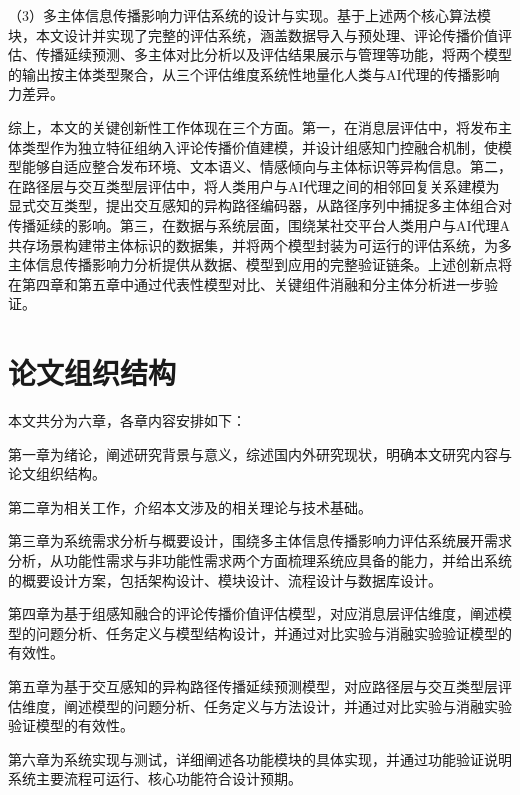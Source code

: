 （3）多主体信息传播影响力评估系统的设计与实现。基于上述两个核心算法模块，本文设计并实现了完整的评估系统，涵盖数据导入与预处理、评论传播价值评估、传播延续预测、多主体对比分析以及评估结果展示与管理等功能，将两个模型的输出按主体类型聚合，从三个评估维度系统性地量化人类与AI代理的传播影响力差异。

综上，本文的关键创新性工作体现在三个方面。第一，在消息层评估中，将发布主体类型作为独立特征组纳入评论传播价值建模，并设计组感知门控融合机制，使模型能够自适应整合发布环境、文本语义、情感倾向与主体标识等异构信息。第二，在路径层与交互类型层评估中，将人类用户与AI代理之间的相邻回复关系建模为显式交互类型，提出交互感知的异构路径编码器，从路径序列中捕捉多主体组合对传播延续的影响。第三，在数据与系统层面，围绕某社交平台人类用户与AI代理A共存场景构建带主体标识的数据集，并将两个模型封装为可运行的评估系统，为多主体信息传播影响力分析提供从数据、模型到应用的完整验证链条。上述创新点将在第四章和第五章中通过代表性模型对比、关键组件消融和分主体分析进一步验证。

\section{论文组织结构}

本文共分为六章，各章内容安排如下：

第一章为绪论，阐述研究背景与意义，综述国内外研究现状，明确本文研究内容与论文组织结构。

第二章为相关工作，介绍本文涉及的相关理论与技术基础。

第三章为系统需求分析与概要设计，围绕多主体信息传播影响力评估系统展开需求分析，从功能性需求与非功能性需求两个方面梳理系统应具备的能力，并给出系统的概要设计方案，包括架构设计、模块设计、流程设计与数据库设计。

第四章为基于组感知融合的评论传播价值评估模型，对应消息层评估维度，阐述模型的问题分析、任务定义与模型结构设计，并通过对比实验与消融实验验证模型的有效性。

第五章为基于交互感知的异构路径传播延续预测模型，对应路径层与交互类型层评估维度，阐述模型的问题分析、任务定义与方法设计，并通过对比实验与消融实验验证模型的有效性。

第六章为系统实现与测试，详细阐述各功能模块的具体实现，并通过功能验证说明系统主要流程可运行、核心功能符合设计预期。
